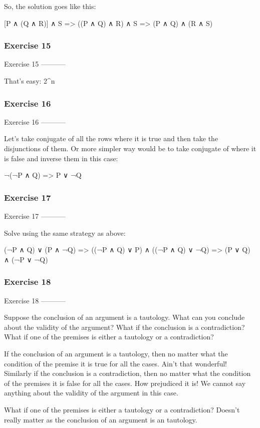 So, the solution goes like this:

    [P ∧ (Q ∧ R)] ∧ S
    => ((P ∧ Q) ∧ R) ∧ S
    => (P ∧ Q) ∧ (R ∧ S)

\subsubsection{Exercise 15}
Exercise 15
-----------

That's easy: 2^n

\subsubsection{Exercise 16}
Exercise 16
-----------

Let's take conjugate of all the rows where it is true and then take
the disjunctions of them. Or more simpler way would be to take
conjugate of where it is false and inverse them in this case:

    ¬(¬P ∧ Q)
    => P ∨ ¬Q

\subsubsection{Exercise 17}
Exercise 17
-----------

Solve using the same strategy as above:

    (¬P ∧ Q) ∨ (P ∧ ¬Q)
    => ((¬P ∧ Q) ∨ P) ∧ ((¬P ∧ Q) ∨ ¬Q)
    => (P ∨ Q) ∧ (¬P ∨ ¬Q)

\subsubsection{Exercise 18}
Exercise 18
-----------

    Suppose the conclusion of an argument is a tautology. What can you
    conclude about the validity of the argument? What if the conclusion is
    a contradiction? What if one of the premises is either a tautology or a
    contradiction?

If the conclusion of an argument is a tautology, then no matter what
the condition of the premise it is true for all the cases. Ain't that
wonderful! Similarly if the conclusion is a contradiction, then no
matter what the condition of the premises it is false for all the
cases. How prejudiced it is! We cannot say anything about the validity
of the argument in this case.

What if one of the premises is either a tautology or a contradiction?
Doesn't really matter as the conclusion of an argument is an
tautology.
